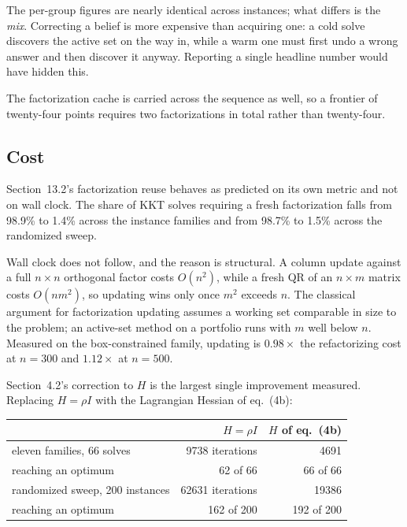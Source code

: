 \documentclass[11pt,a4paper]{article}
\begin{document}
The per-group figures are nearly identical across instances; what
differs is the \emph{mix}. Correcting a belief is more expensive than
acquiring one: a cold solve discovers the active set on the way in,
while a warm one must first undo a wrong answer and then discover it
anyway. Reporting a single headline number would have hidden this.

The factorization cache is carried across the sequence as well, so a
frontier of twenty-four points requires two factorizations in total
rather than twenty-four.

\subsection{Cost}

Section~13.2's factorization reuse behaves as predicted on its own
metric and not on wall clock. The share of KKT solves requiring a
fresh factorization falls from 98.9\% to 1.4\% across the instance
families and from 98.7\% to 1.5\% across the randomized sweep.

Wall clock does not follow, and the reason is structural. A column
update against a full $n\times n$ orthogonal factor costs $O(n^2)$,
while a fresh QR of an $n\times m$ matrix costs $O(nm^2)$, so updating
wins only once $m^2$ exceeds $n$. The classical argument for
factorization updating assumes a working set comparable in size to the
problem; an active-set method on a portfolio runs with $m$ well below
$n$. Measured on the box-constrained family, updating is $0.98\times$
the refactorizing cost at $n=300$ and $1.12\times$ at $n=500$.

Section~4.2's correction to $H$ is the largest single improvement
measured. Replacing $H=\rho I$ with the Lagrangian Hessian of
eq.~(4b):

\begin{center}
\begin{tabular}{lrr}
\hline
& $H=\rho I$ & $H$ of eq.~(4b)\\
\hline
eleven families, 66 solves & 9738 iterations & 4691\\
\quad reaching an optimum & 62 of 66 & 66 of 66\\
randomized sweep, 200 instances & 62631 iterations & 19386\\
\quad reaching an optimum & 162 of 200 & 192 of 200\\
\hline
\end{tabular}
\end{center}
\end{document}
